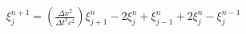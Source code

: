 \documentclass[preview]{standalone}
\begin{document}
\begin{align*}
\xi_{j}^{n+1} = \left(\frac{\Delta x^2}{\Delta t^2c^2}\right) \xi_{j+1}^{n} - 2 \xi_{j}^{n} + \xi_{j-1}^{n} +  2 \xi_{j}^{n} - \xi_{j}^{n-1}
\end{align*}
\end{document}
